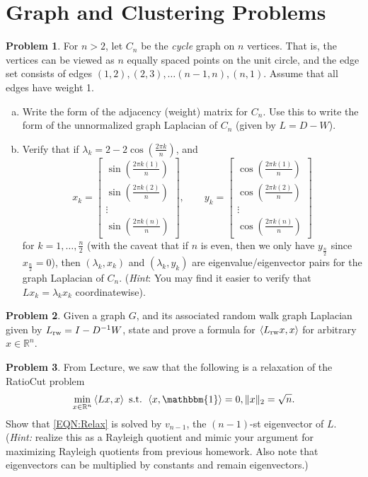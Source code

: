 \documentclass{amsart}[11pt]
\theoremstyle{definition}
\newtheorem{problem}{Problem}
\newcommand{\R}{\mathbb{R}}
\newcommand{\bracket}[1]{\left\langle#1\right\rangle}
\newcommand{\rw}{\textnormal{rw}}
\begin{document}
\section{Graph and Clustering Problems}

\begin{problem}
For $n>2$, let $C_n$ be the \textit{cycle} graph on $n$ vertices. That is, the vertices can be viewed as $n$ equally spaced points on the unit circle, and the edge set consists of edges $(1,2), (2,3), \dots (n-1,n), (n,1)$.  Assume that all edges have weight 1.

\begin{enumerate}[(a)]
\item Write the form of the adjacency (weight) matrix for $C_n$.  Use this to write the form of the unnormalized graph Laplacian of $C_n$ (given by $L=D-W$).
\item Verify that if $\lambda_k = 2-2\cos(\frac{2\pi k}{n})$, and 
\[ x_k = \begin{bmatrix}\sin\left(\frac{2\pi k(1)}{n}\right)\\\sin\left(\frac{2\pi k(2)}{n}\right)\\ \vdots \\ \sin\left(\frac{2\pi k(n)}{n}\right)\end{bmatrix},\qquad y_k = \begin{bmatrix}\cos\left(\frac{2\pi k(1)}{n}\right)\\\cos\left(\frac{2\pi k(2)}{n}\right)\\ \vdots \\ \cos\left(\frac{2\pi k(n)}{n}\right)\end{bmatrix}\]
for $k=1,\dots,\frac{n}{2}$ (with the caveat that if $n$ is even, then we only have $y_{\frac{n}{2}}$ since $x_\frac{n}{2}=0$), then $(\lambda_k,x_k)$ and $(\lambda_k,y_k)$ are eigenvalue/eigenvector pairs for the graph Laplacian of $C_n$. (\textit{Hint}: You may find it easier to verify that $Lx_k=\lambda_kx_k$ coordinatewise).
\end{enumerate}
\end{problem}

\begin{problem}
Given a graph $G$, and its associated random walk graph Laplacian given by $L_{\rw} = I-D^{-1}W$, state and prove a formula for $\bracket{L_{\textnormal{rw}}x,x}$ for arbitrary $x\in\R^n$.
\end{problem}

\begin{problem}
From Lecture, we saw that the following is a relaxation of the RatioCut problem
\begin{equation}\label{EQN:Relax}
\min_{x\in\R^n}\bracket{Lx,x} \textnormal{ s.t. } \bracket{x,\mathbbm{1}}=0, \|x\|_2=\sqrt{n}.
\end{equation}
Show that \eqref{EQN:Relax} is solved by $v_{n-1}$, the $(n-1)$-st eigenvector of $L$.   (\textit{Hint:} realize this as a Rayleigh quotient and mimic your argument for maximizing Rayleigh quotients from previous homework. Also note that eigenvectors can be multiplied by constants and remain eigenvectors.) 
\end{problem}
\end{document}
